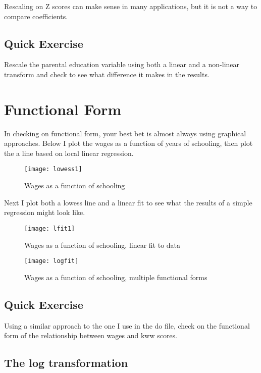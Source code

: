 \documentclass[12pt]{article}
\begin{document}
Rescaling on Z scores can make sense in many applications, but it is
not a way to compare coefficients. 

\subsection{Quick Exercise}

Rescale the parental education variable using both a linear and a
non-linear transform and check to see what
difference it makes in the results. 

\section{Functional Form}
\label{sec:functional-form}

In checking on functional form, your best bet is almost always using
graphical approaches. Below I plot the wages as a function of years of
schooling, then plot the a line based on local linear regression. 

\begin{figure}[ht!]
  \centering
  \caption{Wages as a function of schooling}
  \texttt{[image: lowess1]}
  \label{fig:lowess1}
\end{figure}

Next I plot both a lowess line and a linear fit to see what the
results of a simple regression might look like. 

\begin{figure}[ht!]
  \centering
  \caption{Wages as a function of schooling, linear fit to data}
\texttt{[image: lfit1]}
  \label{fig:lfit}
\end{figure}


\begin{figure}[ht!]
  \centering
  \caption{Wages as a function of schooling, multiple functional forms}
  \texttt{[image: logfit]}
  \label{fig:mutlfit}
\end{figure}
\subsection{Quick Exercise}
Using a similar approach to the one I use in the do file, check on the
functional form of the relationship between wages and kww scores. 

\subsection{The log transformation}
\label{sec:log-transformation}
\end{document}
